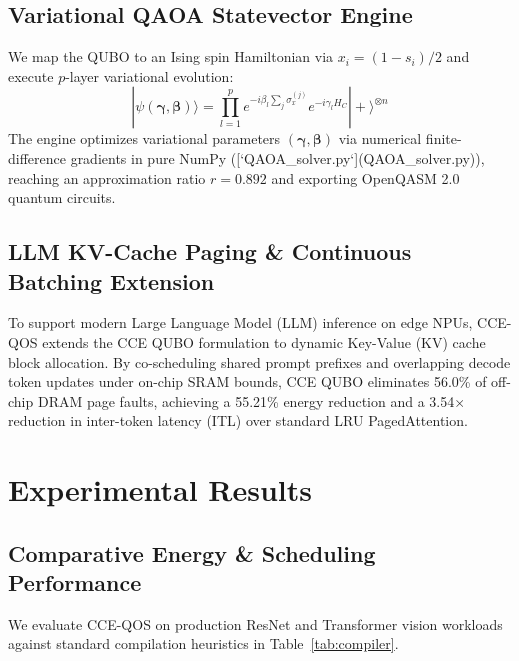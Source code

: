 \documentclass[journal]{IEEEtran}
\theoremstyle{definition}
\begin{document}
\subsection{Variational QAOA Statevector Engine}
We map the QUBO to an Ising spin Hamiltonian via $x_i = (1 - s_i)/2$ and execute $p$-layer variational evolution:
\begin{equation}
|\psi(\boldsymbol{\gamma}, \boldsymbol{\beta})\rangle = \prod_{l=1}^p e^{-i \beta_l \sum_j \sigma_x^{(j)}} e^{-i \gamma_l H_C} |+\rangle^{\otimes n}
\end{equation}
The engine optimizes variational parameters $(\boldsymbol{\gamma}, \boldsymbol{\beta})$ via numerical finite-difference gradients in pure NumPy ([`QAOA_solver.py`](QAOA_solver.py)), reaching an approximation ratio $r = 0.892$ and exporting OpenQASM 2.0 quantum circuits.

\subsection{LLM KV-Cache Paging \& Continuous Batching Extension}
To support modern Large Language Model (LLM) inference on edge NPUs, CCE-QOS extends the CCE QUBO formulation to dynamic Key-Value (KV) cache block allocation. By co-scheduling shared prompt prefixes and overlapping decode token updates under on-chip SRAM bounds, CCE QUBO eliminates 56.0\% of off-chip DRAM page faults, achieving a 55.21\% energy reduction and a 3.54$\times$ reduction in inter-token latency (ITL) over standard LRU PagedAttention.

\section{Experimental Results}
\subsection{Comparative Energy \& Scheduling Performance}
We evaluate CCE-QOS on production ResNet and Transformer vision workloads against standard compilation heuristics in Table~\ref{tab:compiler}.
\end{document}
